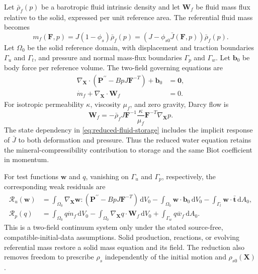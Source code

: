 \documentclass[11pt]{article}
\newcommand{\mbf}[1]{\mathbf{#1}}
\newcommand{\dd}{\,\mathrm d}
\begin{document}
Let \(\bar\rho_f(p)\) be a barotropic fluid intrinsic density and let
\(\mbf W_f\) be fluid mass flux relative to the solid, expressed per unit
reference area.  The referential fluid mass becomes
\begin{equation}
 m_f(\mbf F,p)
 =J(1-\phi_s)\bar\rho_f(p)
 =\left(J-\phi_{s0}\bar J(\mbf F,p)\right)\bar\rho_f(p).
 \label{eq:reduced-fluid-storage}
\end{equation}
Let \(\Omega_0\) be the solid reference domain, with displacement and
traction boundaries \(\Gamma_u\) and \(\Gamma_t\), and pressure and normal
mass-flux boundaries \(\Gamma_p\) and \(\Gamma_w\).  Let \(\mbf b_0\) be
body force per reference volume.  The two-field governing equations are
\begin{align}
 \nabla_{\mbf X}\mathbin{\cdot}
 \left(\mbf P^{\prime\prime}-BpJ\mbf F^{-T}\right)
 +\mbf b_0&=\mbf 0,
 \label{eq:reduced-momentum}\\
 \dot m_f+\nabla_{\mbf X}\mathbin{\cdot}\mbf W_f&=0.
 \label{eq:reduced-water-mass}
\end{align}
For isotropic permeability \(\kappa\), viscosity \(\mu_f\), and zero
gravity, Darcy flow is
\begin{equation}
 \mbf W_f=-\bar\rho_f J\mbf F^{-1}
 \frac{\kappa}{\mu_f}\mbf F^{-T}\nabla_{\mbf X}p.
 \label{eq:darcy-flux}
\end{equation}
The state dependency in \cref{eq:reduced-fluid-storage} includes the
implicit response of \(\bar J\) to both deformation and pressure.  Thus the
reduced water equation retains the mineral-compressibility contribution to
storage and the same Biot coefficient in momentum.

For test functions \(\mbf w\) and \(q\), vanishing on \(\Gamma_u\) and
\(\Gamma_p\), respectively, the corresponding weak residuals are
\begin{align}
 \mathcal R_u(\mbf w)
 &=\int_{\Omega_0}\nabla_{\mbf X}\mbf w:
 \left(\mbf P^{\prime\prime}-BpJ\mbf F^{-T}\right)\dd V_0
 -\int_{\Omega_0}\mbf w\mathbin{\cdot}\mbf b_0\dd V_0
 -\int_{\Gamma_t}\mbf w\mathbin{\cdot}\bar{\mbf t}\dd A_0,
 \label{eq:reduced-weak-momentum}\\
 \mathcal R_p(q)
 &=\int_{\Omega_0}q\dot m_f\dd V_0
 -\int_{\Omega_0}\nabla_{\mbf X}q\mathbin{\cdot}\mbf W_f\dd V_0
 +\int_{\Gamma_w}q\bar w_f\dd A_0.
 \label{eq:reduced-weak-water}
\end{align}
This is a two-field continuum system only under the stated source-free,
compatible-initial-data assumptions.  Solid production, reactions, or evolving
referential mass restore a solid mass equation and its field.  The reduction
also removes freedom to prescribe \(\rho_s\) independently of the initial
motion and \(\rho_{s0}(\mbf X)\).
\end{document}
